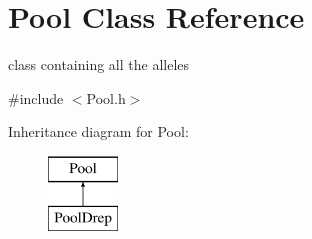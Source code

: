 \hypertarget{class_pool}{}\section{Pool Class Reference}
\label{class_pool}


class containing all the alleles  




{\ttfamily \#include $<$Pool.\+h$>$}

Inheritance diagram for Pool\+:\begin{figure}[H]
\begin{center}
\leavevmode
\includegraphics[height=2.000000cm]{class_pool}
\end{center}
\end{figure}
